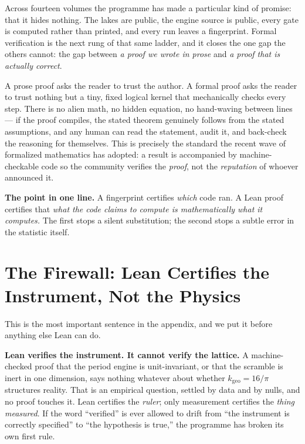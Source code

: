 \documentclass[11pt, letterpaper, openany]{book}
\newcommand{\kgeo}{k_{\mathrm{geo}}}
\begin{document}
Across fourteen volumes the programme has made a particular kind of promise: that it hides nothing.
The lakes are public, the engine source is public, every gate is computed rather than printed, and
every run leaves a fingerprint. Formal verification is the next rung of that same ladder, and it
closes the one gap the others cannot: the gap between \emph{a proof we wrote in prose} and \emph{a
proof that is actually correct}.

A prose proof asks the reader to trust the author. A formal proof asks the reader to trust nothing
but a tiny, fixed logical kernel that mechanically checks every step. There is no alien math, no
hidden equation, no hand-waving between lines --- if the proof compiles, the stated theorem genuinely
follows from the stated assumptions, and any human can read the statement, audit it, and back-check
the reasoning for themselves. This is precisely the standard the recent wave of formalized
mathematics has adopted: a result is accompanied by machine-checkable code so the community verifies
the \emph{proof}, not the \emph{reputation} of whoever announced it.

\begin{warningbox}
\textbf{The point in one line.} A fingerprint certifies \emph{which} code ran. A Lean proof certifies
that \emph{what the code claims to compute is mathematically what it computes.} The first stops a
silent substitution; the second stops a subtle error in the statistic itself.
\end{warningbox}

\section{The Firewall: Lean Certifies the Instrument, Not the Physics}

This is the most important sentence in the appendix, and we put it before anything else Lean can do.

\begin{warningbox}
\textbf{Lean verifies the instrument. It cannot verify the lattice.} A machine-checked proof that the
period engine is unit-invariant, or that the scramble is inert in one dimension, says nothing
whatever about whether $\kgeo = 16/\pi$ structures reality. That is an empirical question, settled by
data and by nulls, and no proof touches it. Lean certifies the \emph{ruler}; only measurement
certifies the \emph{thing measured}. If the word ``verified'' is ever allowed to drift from ``the
instrument is correctly specified'' to ``the hypothesis is true,'' the programme has broken its own
first rule.
\end{warningbox}
\end{document}
